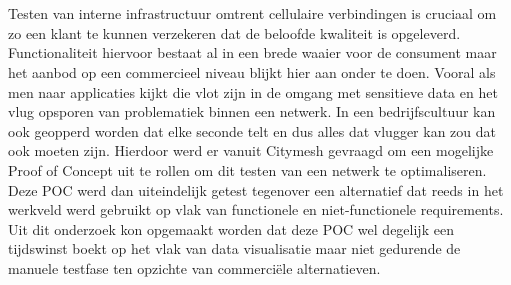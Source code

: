 
%
%
%
%
%

%

\chapter*{}

Testen van interne infrastructuur omtrent cellulaire verbindingen is cruciaal om zo een klant te kunnen verzekeren dat de beloofde kwaliteit is opgeleverd. Functionaliteit hiervoor bestaat al in een brede waaier voor de consument maar het aanbod op een commercieel niveau blijkt hier aan onder te doen. Vooral als men naar applicaties kijkt die vlot zijn in de omgang met sensitieve data en het vlug opsporen van problematiek binnen een netwerk. In een bedrijfscultuur kan ook geopperd worden dat elke seconde telt en dus alles dat vlugger kan zou dat ook moeten zijn. Hierdoor werd er vanuit Citymesh gevraagd om een mogelijke Proof of Concept uit te rollen om dit testen van een netwerk te optimaliseren. Deze POC werd dan uiteindelijk getest tegenover een alternatief dat reeds in het werkveld werd gebruikt op vlak van functionele en niet-functionele requirements. Uit dit onderzoek kon opgemaakt worden dat deze POC wel degelijk een tijdswinst boekt op het vlak van data visualisatie maar niet gedurende de manuele testfase ten opzichte van commerciële alternatieven. 


